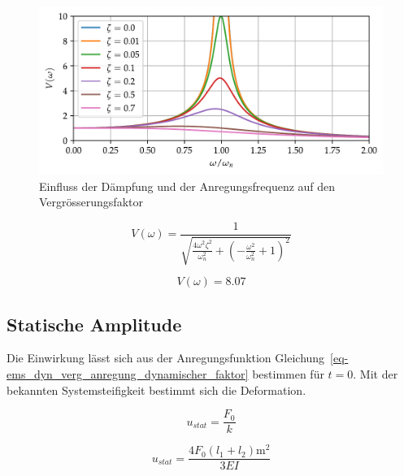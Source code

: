 \documentclass[
  letterpaper,
  DIV=11]{scrreprt}
\begin{document}
\begin{figure}[H]

{\centering \includegraphics{index_files/mediabag/ems_03_files/figure-pdf/fig-ems_dyn_verg_vergroesserungsfaktor-output-1.pdf}

}

\caption{\label{fig-ems_dyn_verg_vergroesserungsfaktor}Einfluss der
Dämpfung und der Anregungsfrequenz auf den Vergrösserungsfaktor}

\end{figure}

\begin{equation}V{\left(\omega \right)} = \frac{1}{\sqrt{\frac{4 \omega^{2} \zeta_{}^{2}}{\omega_{n}^{2}} + \left(- \frac{\omega^{2}}{\omega_{n}^{2}} + 1\right)^{2}}}\end{equation}

\begin{equation}V{\left(\omega \right)} = 8.07\end{equation}

\hypertarget{statische-amplitude}{%
\subsection{Statische Amplitude}\label{statische-amplitude}}

Die Einwirkung lässt sich aus der Anregungsfunktion
Gleichung~\ref{eq-ems_dyn_verg_anregung_dynamischer_faktor} bestimmen
für \(t=0\). Mit der bekannten Systemsteifigkeit bestimmt sich die
Deformation.

\begin{equation}u_{stat} = \frac{F_{0}}{k}\end{equation}

\begin{equation}u_{stat} = \frac{4 F_{0} \left(l_{1} + l_{2}\right) \text{m}^{2}}{3 EI}\end{equation}
\end{document}
